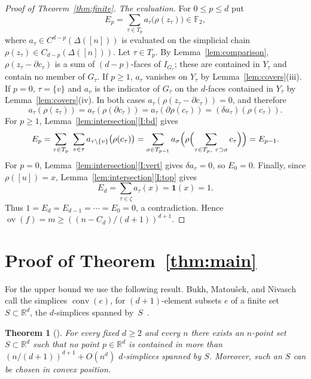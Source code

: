 \documentclass[11pt]{article}
\newtheorem{theorem}{Theorem}[section]
\theoremstyle{definition}
\numberwithin{equation}{section}
\newcommand{\F}{\mathbb F_2}
\newcommand{\one}{\boldsymbol 1}
\newcommand{\R}{\mathbb R}
\DeclareMathOperator{\ov}{ov}
\DeclareMathOperator{\conv}{conv}
\begin{document}
\begin{proof}[Proof of Theorem~\ref{thm:finite}]
\emph{The evaluation.} For $0\le p\le d$ put
\begin{equation*}
 E_p=\sum_{\tau\in T_p}a_\tau\bigl(\rho(z_\tau)\bigr)\in\F,
\end{equation*}
where $a_\tau\in C^{d-p}(\Delta([n]))$ is evaluated on the simplicial chain $\rho(z_\tau)\in C_{d-p}(\Delta([n]))$. Let $\tau\in T_p$. By Lemma~\ref{lem:comparison}, $\rho(z_\tau-\partial c_\tau)$ is a sum of $(d-p)$-faces of $I_{G_\tau}$; these are contained in $Y_\tau$ and contain no member of $G_\tau$. If $p\ge1$, $a_\tau$ vanishes on $Y_\tau$ by Lemma~\ref{lem:covers}(iii). If $p=0$, $\tau=\{v\}$ and $a_v$ is the indicator of $G_\tau$ on the $d$-faces contained in $Y_\tau$ by Lemma~\ref{lem:covers}(iv). In both cases $a_\tau(\rho(z_\tau-\partial c_\tau))=0$, and therefore
\begin{equation*}
 a_\tau(\rho(z_\tau))=a_\tau(\rho(\partial c_\tau))=a_\tau(\partial\rho(c_\tau))=(\delta a_\tau)(\rho(c_\tau)).
\end{equation*}
For $p\ge1$, Lemma~\ref{lem:intersection}\ref{I:bd} gives
\begin{equation*}
 E_p=\sum_{\tau\in T_p}\ \sum_{v\in\tau}a_{\tau\setminus\{v\}}\bigl(\rho(c_\tau)\bigr)=\sum_{\sigma\in T_{p-1}}a_\sigma\Bigl(\rho\Bigl(\sum_{\tau\in T_p,\ \tau\supset\sigma}c_\tau\Bigr)\Bigr)=E_{p-1}.
\end{equation*}
For $p=0$, Lemma~\ref{lem:intersection}\ref{I:vert} gives $\delta a_v=0$, so $E_0=0$. Finally, since $\rho([u])=x$, Lemma~\ref{lem:intersection}\ref{I:top} gives
\begin{equation*}
 E_d=\sum_{\tau\in\zeta}a_\tau(x)=\one(x)=1.
\end{equation*}
Thus $1=E_d=E_{d-1}=\cdots=E_0=0$, a contradiction. Hence $\ov(f)=m\ge((n-C_d)/(d+1))^{d+1}$.
\end{proof}

\section{Proof of Theorem~\ref{thm:main}}\label{sec:final}

For the upper bound we use the following result. Bukh, Matou\v{s}ek, and Nivasch call the simplices $\conv(e)$, for $(d+1)$-element subsets $e$ of a finite set $S\subset\R^d$, the $d$-simplices spanned by~$S$~\cite[\S1]{BMN}.

\begin{theorem}[{\cite[Theorem~1.3]{BMN}}]\label{thm:bmn}
For every fixed $d\ge2$ and every $n$ there exists an $n$-point set $S\subset\R^d$ such that no point $p\in\R^d$ is contained in more than $(n/(d+1))^{d+1}+O(n^d)$ $d$-simplices spanned by $S$. Moreover, such an $S$ can be chosen in convex position.
\end{theorem}
\end{document}

